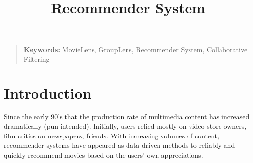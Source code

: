 \documentclass[conference]{IEEEtran}
\begin{document}
\title{Recommender System}

\author{
\and
{}
}


\maketitle
\thispagestyle{plain}


\begin{abstract}

\end{abstract}

\begin{quote}
\small
\noindent
\textbf{Keywords:} MovieLens, GroupLens, Recommender System, Collaborative Filtering
\end{quote}

\IEEEpeerreviewmaketitle


\section{Introduction}

Since the early 90's that the production rate of multimedia content has increased dramatically (pun intended). Initially, users relied mostly on video store owners, film critics on newspapers, friends. With increasing volumes of content, recommender systems have appeared as data-driven methods to reliably and quickly recommend movies based on the users' own appreciations.

\end{document}
